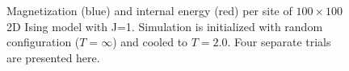 \documentclass{article}
\begin{document}
\begin{figure}
\hspace{0mm}
\caption{Magnetization (blue) and internal energy (red) per site of $100 \times 100$
2D Ising model with J=1. Simulation is initialized with random configuration
($T = \infty$) and cooled to $T=2.0$. Four separate trials are presented here.}
\end{figure}

\end{document}
